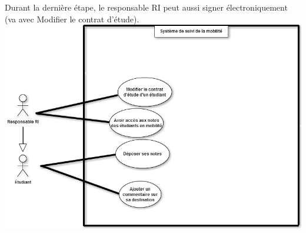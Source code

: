 \newline
Durant la dernière étape, le responsable RI peut aussi signer électroniquement (va avec Modifier le contrat d'étude).
\newline
\includegraphics[scale=0.5]{Projet/useCaseDiag/suivi.png}